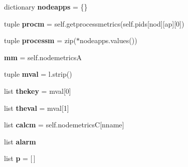 \begin{DoxyCompactItemize}
\item 
\hypertarget{classperflogserver_1_1_log_session_a770d8539dc7b8b6bf23c41ab382b5308}{dictionary {\bfseries nodeapps} = \{\}}\label{classperflogserver_1_1_log_session_a770d8539dc7b8b6bf23c41ab382b5308}

\item 
\hypertarget{classperflogserver_1_1_log_session_a8a20c03ddb2cb435d7c84e80c1340e9e}{tuple {\bfseries procm} = self.\+getprocessmetrics(self.\+pids\mbox{[}nod\mbox{]}\mbox{[}ap\mbox{]}\mbox{[}0\mbox{]})}\label{classperflogserver_1_1_log_session_a8a20c03ddb2cb435d7c84e80c1340e9e}

\item 
\hypertarget{classperflogserver_1_1_log_session_ac1ffc8cf983734bd72ada691336fe5ad}{tuple {\bfseries processm} = zip($\ast$nodeapps.\+values())}\label{classperflogserver_1_1_log_session_ac1ffc8cf983734bd72ada691336fe5ad}

\item 
\hypertarget{classperflogserver_1_1_log_session_a4f49d783b5556a42a063970747819e53}{{\bfseries mm} = self.\+nodemetrics\+A}\label{classperflogserver_1_1_log_session_a4f49d783b5556a42a063970747819e53}

\item 
\hypertarget{classperflogserver_1_1_log_session_af470cab9740e9fb18f5cc3b6667e563d}{tuple {\bfseries mval} = l.\+strip()}\label{classperflogserver_1_1_log_session_af470cab9740e9fb18f5cc3b6667e563d}

\item 
\hypertarget{classperflogserver_1_1_log_session_a687465d182a07673417503488b6f3ac2}{list {\bfseries thekey} = mval\mbox{[}0\mbox{]}}\label{classperflogserver_1_1_log_session_a687465d182a07673417503488b6f3ac2}

\item 
\hypertarget{classperflogserver_1_1_log_session_ac6079521ae067029d52e0470639ff3fb}{list {\bfseries theval} = mval\mbox{[}1\mbox{]}}\label{classperflogserver_1_1_log_session_ac6079521ae067029d52e0470639ff3fb}

\item 
\hypertarget{classperflogserver_1_1_log_session_abea0d2129a2d53127bb87dcb98fdea62}{list {\bfseries calcm} = self.\+nodemetrics\+C\mbox{[}nname\mbox{]}}\label{classperflogserver_1_1_log_session_abea0d2129a2d53127bb87dcb98fdea62}

\item 
list {\bfseries alarm}
\item 
\hypertarget{classperflogserver_1_1_log_session_ad825f132fd07cded455b41e4c1f064fe}{list {\bfseries p} = \mbox{[}$\,$\mbox{]}}\label{classperflogserver_1_1_log_session_ad825f132fd07cded455b41e4c1f064fe}


\end{DoxyCompactItemize}
